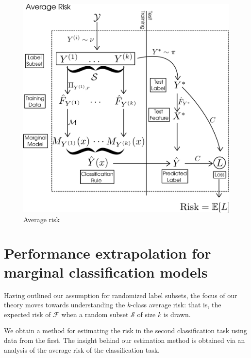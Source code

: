 \documentclass[12pt]{article}
\begin{document}
\begin{figure}[h]
\centering
\includegraphics[scale = 0.3]{extrapolation_figures/average_risk.png}
\caption{Average risk}\label{fig:average_risk}
\end{figure}






\section{Performance extrapolation for marginal classification models}

Having outlined our assumption for randomized label subsets, the focus
of our theory moves towards understanding the $k$-class average risk:
that is, the expected risk of $\mathcal{F}$ when a random subset
$\mathcal{S}$ of size $k$ is drawn.

We obtain a method for estimating the risk in the second
classification task using data from the first.  The insight behind our
estimation method is obtained via an analysis of the average risk of
the classification task.
\end{document}

